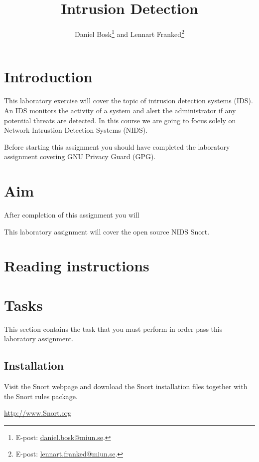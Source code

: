 \documentclass[a4paper,nocourse]{miunasgn}
\title{Intrusion Detection}
\author{Daniel Bosk\footnote{%
        E-post: \protect\url{daniel.bosk@miun.se}.
        } and
        Lennart Franked\footnote{%
            E-post: \protect\url{lennart.franked@miun.se}.
        }
}
\date{\svnId}
\begin{document}
\maketitle
\thispagestyle{foot}
\tableofcontents

\section{Introduction}
\label{sec:Introduction}
This laboratory exercise will cover the topic of intrusion detection
systems (IDS). An IDS monitors the activity of a system and alert the 
administrator if any potential threats are detected. In this course we are 
going to focus solely on Network Intrustion Detection Systems (NIDS).

Before starting this assignment you should have completed the laboratory
assignment covering GNU Privacy Guard (GPG).

\section{Aim}
\label{sec:Aim}
After completion of this assignment you will
\begin{itemize}
    
\end{itemize}

This laboratory assignment will cover the open source NIDS Snort.

\section{Reading instructions}
\label{sec:Readinginstructions}


\section{Tasks}
\label{sec:Tasks}
This section contains the task that you must perform in order pass this
laboratory assignment.

\subsection{Installation}
\label{subsec:Install}
Visit the Snort webpage and download the Snort installation files together with
the Snort rules package.

\begin{center}
\url{http://www.Snort.org}
\end{center}
\end{document}
